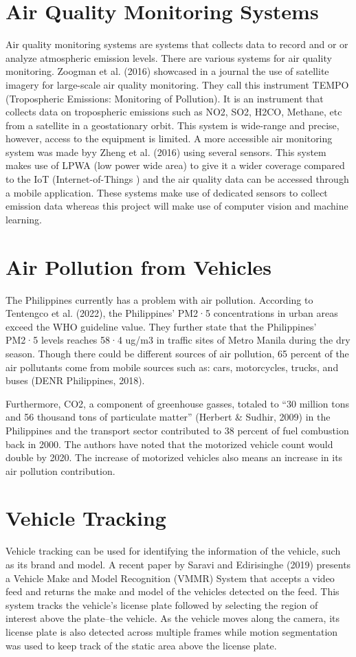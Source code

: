 \section{Air Quality Monitoring Systems}
Air quality monitoring systems are systems that collects data to record and or or analyze atmospheric emission levels. There are various systems for air quality monitoring. Zoogman et al. (2016) showcased in a journal the use of satellite imagery for large-scale air quality monitoring. They call this instrument TEMPO (Tropospheric Emissions: Monitoring of Pollution). It is an instrument that collects data on tropospheric emissions such as NO2, SO2, H2CO, Methane, etc from a satellite in a geostationary orbit. This system is wide-range and precise,  however, access to the equipment is limited.  A more accessible air monitoring system was made byy Zheng et al. (2016) using several sensors. This system makes use of LPWA (low power wide area) to give it a wider coverage compared to the IoT (Internet-of-Things ) and the air quality data can be accessed through a mobile application. These systems make use of dedicated sensors to collect emission data whereas this project will make use of computer vision and machine learning.


\section{Air Pollution from Vehicles}
The Philippines currently has a problem with air pollution. According to Tentengco et al. (2022), the Philippines’ PM2·5 concentrations in urban areas exceed the WHO guideline value. They further state that the Philippines’ PM2·5 levels reaches 58·4 ug/m3 in traffic sites of Metro Manila during the dry season. Though there could be different sources of air pollution, 65 percent of the air pollutants come from mobile sources such as: cars, motorcycles, trucks, and buses (DENR Philippines, 2018).

	Furthermore, CO2, a component of greenhouse gasses, totaled  to “30 million tons and 56 thousand tons of particulate matter” (Herbert \& Sudhir, 2009) in the Philippines and the transport sector contributed to 38 percent of fuel combustion back in 2000. The authors have noted that the motorized vehicle count would double by 2020. The increase of motorized vehicles also means an increase in its air pollution contribution. 

\section{Vehicle Tracking}
Vehicle tracking can be used for identifying the information of the vehicle, such as its brand and model. A recent paper by Saravi and Edirisinghe (2019) presents a Vehicle Make and Model Recognition (VMMR) System that accepts a video feed and returns the make and model of the vehicles detected on the feed. This system tracks the vehicle’s license plate followed by selecting the region of interest above the plate–the vehicle. As the vehicle moves along the camera, its license plate is also detected across multiple frames while motion segmentation was used to keep track of the static area above the license plate.

